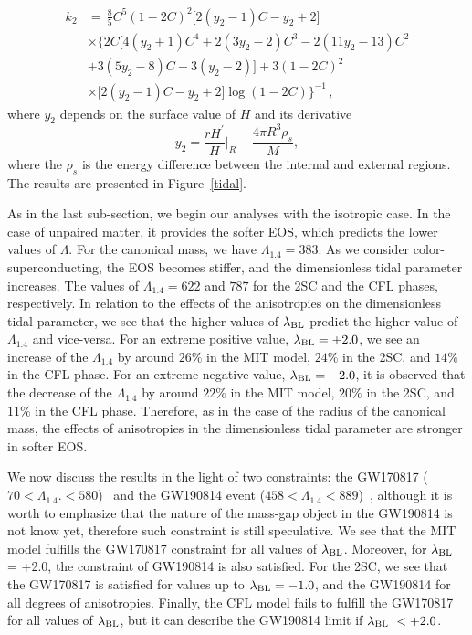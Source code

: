\documentclass[%
reprint,
superscriptaddress,
nofootinbib,
amsmath,
amssymb,
aps,
floatfix,
showkeys,
]{revtex4-2}
\begin{document}
\begin{align}
    k_2 &= \, \frac{8}{5} C^5 (1-2C)^2 \big[ 2(y_2-1)C - y_2 + 2 \big]
    \nonumber \\ &
    \times \Big\{ 2C \big[ 4(y_2+1)C^4 + 2(3y_2-2)C^3 - 2(11y_2-13)C^2 
    \nonumber \\ &
    + 3(5y_2-8)C - 3(y_2-2) \big]+ 3(1-2C)^2 
    \nonumber \\ &
    \times \big[ 2(y_2-1)C-y_2+2 \big] \log(1-2C) \Big\}^{-1} \, , 
    \label{eq:k2}
\end{align}
where $y_2$ depends on the surface value of $H$ and its derivative 
\begin{equation}
    y_2 = \frac{rH^{'}}{H}\Big|_R - \frac{4\pi R^3 \rho_s}{M},
\end{equation}
where the $\rho_s$ is the energy difference between the internal and external regions. The results are presented in Figure~\ref{tidal}.

As in the last sub-section, we begin our analyses with the isotropic case. In the case of unpaired matter, it provides the softer EOS, which predicts the lower values of $\Lambda$. For the canonical mass, we have $\Lambda_{1.4} = 383$. As we consider color-superconducting, the EOS becomes stiffer, and the dimensionless tidal parameter increases. The values of  $\Lambda_{1.4} = 622$ and $787$ for the 2SC and the CFL phases, respectively. In relation to the effects of the anisotropies on the dimensionless tidal parameter, we see that the higher values of $\lambda_{\rm BL}$ predict the higher value of $\Lambda_{1.4}$ and vice-versa. For an extreme positive value, $\lambda_{\rm BL} = +2.0$, we see an increase of the $\Lambda_{1.4}$ by around $26\%$ in the MIT model, $24\%$ in the 2SC, and $14\%$ in the CFL phase.  For an extreme negative value, $\lambda_{\rm BL} = -2.0$, it is observed that the decrease of the $\Lambda_{1.4}$ by around $22\%$ in the MIT model, $20\%$ in the 2SC, and $11\%$ in the CFL phase. Therefore, as in the case of the radius of the canonical mass, the effects of anisotropies in the dimensionless tidal parameter are stronger in softer EOS.

We now discuss the results in the light of two constraints: the GW170817 ($70<\Lambda_{1.4}.<580$)~\cite{Abbott_2018} and the  GW190814 event ($458 <\Lambda_{1.4}< 889$)~\cite{RAbbott_2020}, although it is worth to emphasize that the nature of the mass-gap object in the GW190814 is not know yet, therefore such constraint is still speculative. We see that the MIT model fulfills the GW170817 constraint for all values of $\lambda_{\rm BL}$. Moreover, for $\lambda_{\rm BL}$ = +2.0, the constraint of GW190814 is also satisfied.  For the 2SC, we see that the GW170817 is satisfied for values up to $\lambda_{\rm BL} = -1.0$, and the GW190814 for all degrees of anisotropies. Finally, the CFL model fails to fulfill the GW170817 for all values of $\lambda_{\rm BL}$, but it can describe the GW190814 limit if $\lambda_{\rm BL}~<+2.0$.
\end{document}
